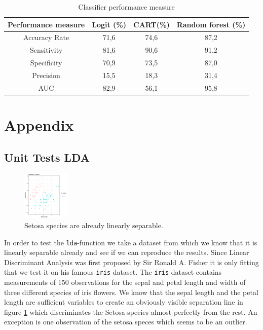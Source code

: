 \documentclass{article}
\begin{document}
\begin{center}
\begin{table}[h]
\centering
\caption{Classifier performance measure}
\begin{tabular}{cccc}
\hline\hline
Performance measure  &                Logit (\%)   &                  CART(\%)   &     Random forest (\%) \\
\hline
Accuracy Rate        &                 71,6        &                 74,6        &       87,2             \\
Sensitivity          &                 81,6        &                 90,6        &       91,2             \\
Specificity          &                 70,9        &                 73,5        &       87,0             \\
Precision            &                 15,5        &                 18,3        &       31,4             \\
AUC                  &                 82,9        &                 56,1        &       95,8             \\
\hline\hline
\end{tabular}
\end{table}
\end{center}
\newpage
\section{Appendix}

\subsection{Unit Tests LDA}
\begin{figure}
\label{iris}
\includegraphics[scale=0.8, width=0.2\textwidth, trim={10mm 20mm 30mm 30mm}]{../LDA/iris.png}
\vspace{2mm}
\footnotesize\caption{Setosa species are already linearly separable.}
\end{figure}

In order to test the \texttt{lda}-function we take a dataset from which we know that it is linearly separable already and see if we can reproduce the results. Since Linear Discriminant Analysis was first proposed by Sir Ronald A. Fisher it is only fitting that we test it on his famous \texttt{iris} dataset. The \texttt{iris} dataset contains measurements of 150 observations for the sepal and petal length and width of three different species of iris flowers. We know that the sepal length and the petal length are sufficient variables to create an obviously visible separation line in figure \ref{iris} which discriminates the Setosa-species almost perfectly from the rest. An exception is one observation of the setosa speces which seems to be an outlier. 
\end{document}
